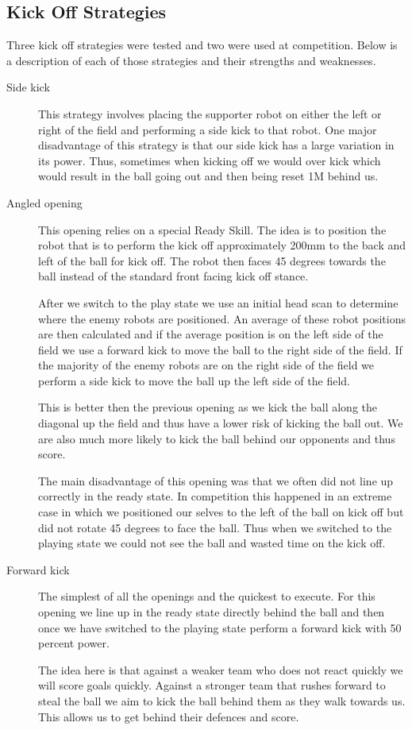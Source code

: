 \documentclass[pdftex,11pt,a4paper]{report}
\begin{document}
\subsection{Kick Off Strategies}
Three kick off strategies were tested and two were used at competition. Below is a description of each of those strategies and their strengths and weaknesses.
\begin{description}
\item[Side kick] This strategy involves placing the supporter robot on either the left or right of the field and performing a side kick to that robot. One major disadvantage of this strategy is that our side kick has a large variation in its power. Thus, sometimes when kicking off we would over kick which would result in the ball going out and then being reset 1M behind us.
\item[Angled opening] This opening relies on a special Ready Skill. The idea is to position the robot that is to perform the kick off approximately 200mm to the back and left of the ball for kick off. The robot then faces 45 degrees towards the ball instead of the standard front facing kick off stance.

After we switch to the play state we use an initial head scan to determine where the enemy robots are positioned. An average of these robot positions are then calculated and if the average position is on the left side of the field we use a forward kick to move the ball to the right side of the field. If the majority of the enemy robots are on the right side of the field we perform a side kick to move the ball up the left side of the field. 

This is better then the previous opening as we kick the ball along the diagonal up the field and thus have a lower risk of kicking the ball out. We are also much more likely to kick the ball behind our opponents and thus score.

The main disadvantage of this opening was that we often did not line up correctly in the ready state. In competition this happened in an extreme case in which we positioned our selves to the left of the ball on kick off but did not rotate 45 degrees to face the ball. Thus when we switched to the playing state we could not see the ball and wasted time on the kick off.

\item[Forward kick] The simplest of all the openings and the quickest to execute. For this opening we line up in the ready state directly behind the ball and then once we have switched to the playing state perform a forward kick with 50 percent power.

The idea here is that against a weaker team who does not react quickly we will score goals quickly. Against a stronger team that rushes forward to steal the ball we aim to kick the ball behind them as they walk towards us. This allows us to get behind their defences and score.
\end{description}
\end{document}
